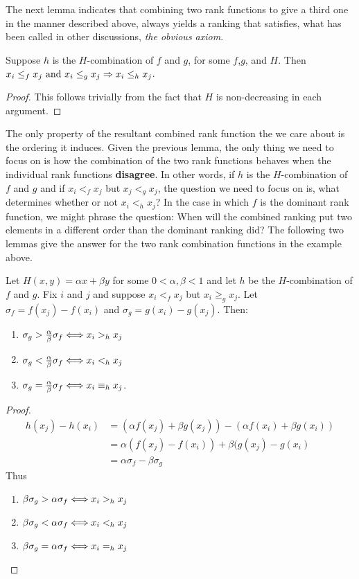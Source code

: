 \documentclass{article}
\begin{document}
The next lemma indicates that combining two rank functions to give a third one in the manner described above, always yields a 
ranking that satisfies, what has been called in other discussions, \emph{the obvious axiom}.
\begin{lemma}
Suppose $h$ is the $H$-combination of $f$ and $g$, for some $f$,$g$, and $H$. Then
$x_i \leq_f x_j \text{ and } x_i \leq_g x_j \Rightarrow x_i \leq_h x_j$.
\end{lemma}
\begin{proof}
This follows trivially from the fact that $H$ is non-decreasing in each argument.
\end{proof}

The only property of the resultant combined rank function the we care about is
the ordering it induces. Given the previous lemma, the only thing we need to
focus on is how the combination of the two rank functions behaves when the
individual rank functions \textbf{disagree}. In other words, if  $h$ is the $H$-combination of $f$ and $g$
and if $x_i <_f x_j$ but $x_j <_g x_j$, the question we need to focus on is,
what determines whether or not $x_i <_h x_j$?
In the case in which $f$ is the dominant rank function, we might phrase the question:
When will the combined ranking put two elements in a different order than
the dominant ranking did? 
The following two lemmas give the answer for the two rank combination functions
in the example above.  

\begin{lemma}
Let $H(x,y) = \alpha x + \beta y$ for some $0<\alpha,\beta<1$ and let $h$ be the $H$-combination of $f$ and $g$. Fix $i$ and $j$ and 
suppose $x_i <_f x_j$ but $x_i \geq_g x_j$. Let $\sigma_f = f(x_j) - f(x_i)$ and
$\sigma_g = g(x_i) - g(x_j)$. Then:
\begin{enumerate}
\item $\sigma_g > \frac{\alpha}{\beta} \sigma_f \Longleftrightarrow x_i >_h x_j$
\item $\sigma_g < \frac{\alpha}{\beta} \sigma_f \Longleftrightarrow x_i <_h x_j$
\item $\sigma_g = \frac{\alpha}{\beta} \sigma_f \Longleftrightarrow x_i \equiv_h x_j$.
\end{enumerate}
\end{lemma}
\begin{proof}
\begin{equation}
\begin{split}
h(x_j)-h(x_i) &= (\alpha f(x_j) + \beta g(x_j)) - (\alpha f(x_i) + \beta g(x_i)
) \\ &= \alpha(f(x_j) - f(x_i)) + \beta(g(x_j) - g(x_i) \\
              &= \alpha\sigma_f - \beta\sigma_g
\end{split}
\end{equation}
Thus
\begin{enumerate}
\item $\beta\sigma_g > \alpha\sigma_f \Longleftrightarrow  x_i >_h x_j $
\item $\beta\sigma_g < \alpha\sigma_f \Longleftrightarrow  x_i <_h x_j $
\item $\beta\sigma_g = \alpha\sigma_f \Longleftrightarrow  x_i =_h x_j $
\end{enumerate}
\end{proof}
\end{document}
